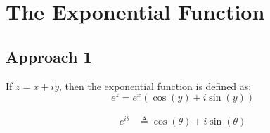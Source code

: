 \section{The Exponential Function}
\subsection*{Approach 1}
\begin{definition}
    If $z = x + iy$, then the exponential function is defined as:
    \begin{equation}
        e^z = e^x \left( \cos(y) + i \sin(y) \right)
    \end{equation}
\end{definition}

\begin{remark}
    \begin{align}
        e^{i\theta} & \triangleq \cos(\theta) + i \sin(\theta) \\
    \end{align}
\end{remark}


